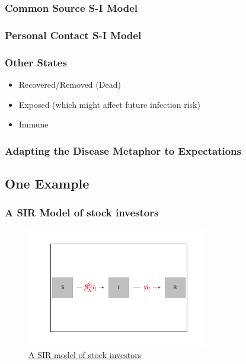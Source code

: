 \documentclass[pdflatex]{beamer}
\begin{document}
\begin{frame}\frametitle{Common Source S-I Model}

\end{frame}

\begin{frame}\frametitle{Personal Contact S-I Model}
    
\end{frame}

\begin{frame}\frametitle{Other States}
\begin{itemize}
    \item Recovered/Removed (Dead)
    \item Exposed (which might affect future infection risk)
    \item Immune
\end{itemize}
\end{frame}

\subsubsection{Adapting the Disease Metaphor to Expectations}\label{subsubsec:AdaptingTheModel}

\hypertarget{AdaptingTheModel}{}


\subsection{One Example}
\label{subsec:shillerpound}

\begin{frame}
	\frametitle{A SIR Model of stock investors \citep{shiller1989survey} }
	\begin{figure}[!ht] \centering  %
		\caption{\href{https://mybinder.org/v2/gh/llorracc/EpiExp/HEAD?filepath=SIR_Ndlib.ipynb}{A SIR model of stock investors}}
		\label{fig:sir_diagram}
		\centerline{\includegraphics[width=0.7\textwidth]{./figures/flow_diagram.png}}
	\end{figure}
\end{frame}
\end{document}
